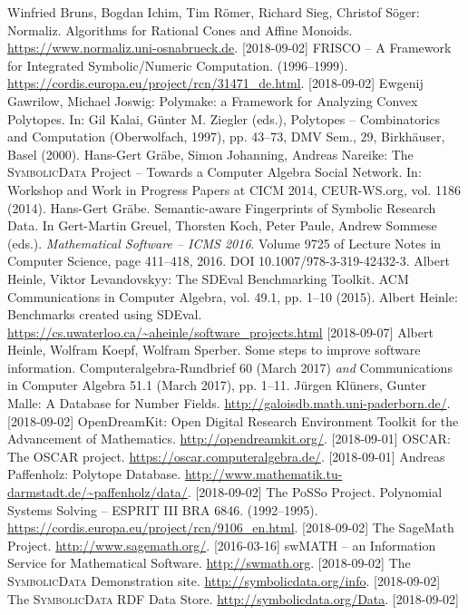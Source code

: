 \documentclass[12pt]{article}
\def\SD{\textsc{Sym\-bolic\-Data}}
\begin{document}
\begin{thebibliography}{xxx}
 Winfried Bruns, Bogdan Ichim, Tim R\"omer, Richard Sieg,
  Christof S\"oger: Normaliz. Algorithms for Rational Cones and Affine Monoids.
  \url{https://www.normaliz.uni-osnabrueck.de}. [2018-09-02]
 FRISCO -- A Framework for Integrated Symbolic/Numeric
  Computation. (1996--1999).
  \url{https://cordis.europa.eu/project/rcn/31471_de.html}.  [2018-09-02]
 Ewgenij Gawrilow, Michael Joswig: Polymake: a Framework for
  Analyzing Convex Polytopes. In: Gil Kalai, G\"unter M. Ziegler (eds.),
  Polytopes -- Combinatorics and Computation (Oberwolfach, 1997), pp. 43--73,
  DMV Sem., 29, Birkh\"auser, Basel (2000).
 Hans-Gert Gr\"abe, Simon Johanning, Andreas Nareike: The
  {\SD} Project -- Towards a Computer Algebra Social Network. In: Workshop and
  Work in Progress Papers at CICM 2014, CEUR-WS.org, vol. 1186 (2014).
 Hans-Gert Gr\"abe. \newblock Semantic-aware Fingerprints of
  Symbolic Research Data. \newblock In Gert-Martin Greuel, Thorsten Koch, Peter
  Paule, Andrew Sommese (eds.).  \emph{Mathematical Software -- ICMS 2016}.
  \newblock Volume 9725 of Lecture Notes in Computer Science, page 411--418,
  2016.  \newblock DOI 10.1007/978-3-319-42432-3.
 Albert Heinle, Viktor Levandovskyy: The SDEval Benchmarking
  Toolkit. ACM Communications in Computer Algebra, vol. 49.1, pp. 1--10 (2015).
 Albert Heinle: Benchmarks created using SDEval. \newblock 
  \url{https://cs.uwaterloo.ca/~aheinle/software_projects.html} [2018-09-07]
 Albert Heinle, Wolfram Koepf, Wolfram Sperber. \newblock Some
  steps to improve software information. \newblock Computeralgebra-Rundbrief 60
  (March 2017) \emph{and} Communications in Computer Algebra 51.1 (March 2017),
  pp. 1--11.
 J\"urgen Kl\"uners, Gunter Malle: A Database for Number
  Fields.  \url{http://galoisdb.math.uni-paderborn.de/}. [2018-09-02]
 OpenDreamKit: Open Digital Research Environment Toolkit for the
  Advancement of Mathematics. \url{http://opendreamkit.org/}. [2018-09-01]
 OSCAR: The OSCAR project.
  \url{https://oscar.computeralgebra.de/}.  [2018-09-01]
 Andreas Paffenholz: Polytope Database.
  \url{http://www.mathematik.tu-darmstadt.de/~paffenholz/data/}.  [2018-09-02]
 The PoSSo Project. Polynomial Systems Solving -- ESPRIT III BRA
  6846.  (1992--1995).
  \url{https://cordis.europa.eu/project/rcn/9106_en.html}.  [2018-09-02]
 The SageMath Project.  \url{http://www.sagemath.org/}.
  [2016-03-16]
 swMATH -- an Information Service for Mathematical Software.
  \newblock \url{http://swmath.org}. [2018-09-02]
 The {\SD} Demonstration site.
  \url{http://symbolicdata.org/info}.  [2018-09-02]
 The {\SD} RDF Data Store.
  \url{http://symbolicdata.org/Data}.  [2018-09-02]
\end{thebibliography}
\end{document}
